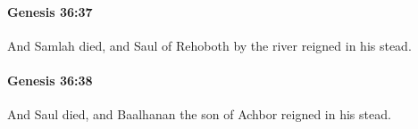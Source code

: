 		\paragraph{Genesis 36:37} %
			\label{GENESIS-36-37}

			And Samlah died, and Saul of Rehoboth by the river reigned in his stead.


		\paragraph{Genesis 36:38} %
			\label{GENESIS-36-38}

			And Saul died, and Baalhanan the son of Achbor reigned in his stead.


